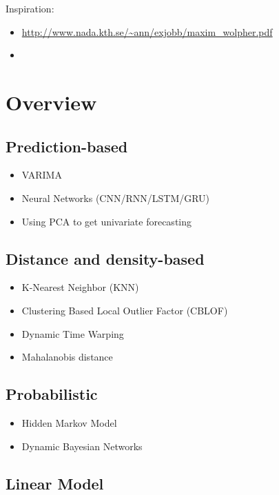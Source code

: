 Inspiration:
\begin{itemize}
    \item \url{http://www.nada.kth.se/~ann/exjobb/maxim_wolpher.pdf}
    \item \cite{Aggarwal2013a}
\end{itemize}

\section*{Overview}

\subsection{Prediction-based}

\begin{itemize}
    \item VARIMA \cite{Aggarwal2013a}
    \item Neural Networks (CNN/RNN/LSTM/GRU)
    \item Using PCA to get univariate forecasting \cite{Aggarwal2013a}
    
\end{itemize}

\subsection{Distance and density-based}

\begin{itemize}
    \item K-Nearest Neighbor (KNN) \cite{Li2019a}
    \item Clustering Based Local Outlier Factor (CBLOF) \cite{Li2019a}
    \item Dynamic Time Warping \cite{Aggarwal2013a}
    \item Mahalanobis distance \cite{Aggarwal2013a}
\end{itemize}

\subsection{Probabilistic}

\begin{itemize}
    \item Hidden Markov Model \cite{Aggarwal2013a}
    \item Dynamic Bayesian Networks
\end{itemize}

\subsection{Linear Model}


